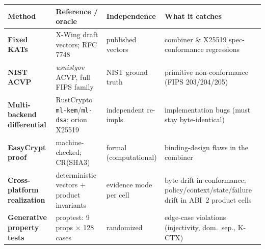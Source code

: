\documentclass[border=4pt]{standalone}
\begin{document}
\footnotesize
\setlength{\tabcolsep}{5pt}\renewcommand{\arraystretch}{1.18}
\begin{tabular}{@{}>{\bfseries}l p{2.9cm} p{2.0cm} p{4.9cm}@{}}
\toprule
\textbf{Method} & \textbf{Reference / oracle} & \textbf{Independence} & \textbf{What it catches} \\
\midrule
Fixed KATs & X-Wing draft vectors; RFC\,7748 & published vectors & combiner \& X25519 spec-conformance regressions \\
NIST ACVP & \textit{usnistgov} ACVP, full FIPS family & NIST ground truth & primitive non-conformance (FIPS 203/204/205) \\
Multi-backend differential & RustCrypto \texttt{ml-kem}/\texttt{ml-dsa}; orion X25519 & independent re-impls. & implementation bugs (must stay byte-identical) \\
EasyCrypt proof & machine-checked; CR(SHA3) & formal (computational) & binding-design flaws in the combiner \\
Cross-platform realization & deterministic vectors $+$ product invariants & evidence mode per cell & byte drift in conformance; policy/context/state/failure drift in ABI~2 product cells \\
Generative property tests & proptest: 9 props $\times$ 128 cases & randomized & edge-case violations (injectivity, dom.\ sep., K-CTX) \\
\bottomrule
\end{tabular}
\end{document}
